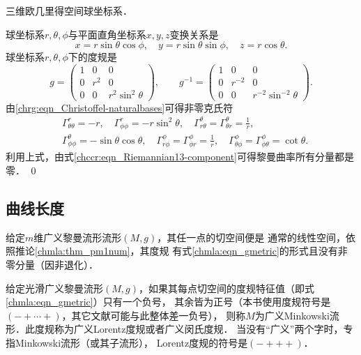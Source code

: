 \begin{example}\label{chrg:exm_S3}
    三维欧几里得空间球坐标系．
\end{example}
球坐标系$r,\theta,\phi$与平面直角坐标系$x,y,z$变换关系是
\begin{equation}\label{chrg:eqn_rtpxyz}
    x  = r\sin\theta \cos\phi ,\quad
    y  = r\sin\theta \sin\phi ,\quad
    z  = r\cos\theta .
\end{equation}
球坐标系$r,\theta,\phi$下的度规是
\begin{equation}\label{chgd:eqn_S3gab}
    g=\begin{pmatrix}  
        1 &0 &0 \\ 0& r^2 & 0 \\ 0& 0 & r^2 \sin^2\theta  
    \end{pmatrix} , \qquad
    g^{-1}=\begin{pmatrix}  
        1 &0&0 \\ 0& r^{-2} & 0 \\ 0& 0 & r^{-2} \sin^{-2}\theta  
    \end{pmatrix} .
\end{equation}
由\eqref{chrg:eqn_Christoffel-naturalbases}可得非零克氏符
\begin{equation}\label{chrg:eqn_S3Gamma}
    \begin{aligned}
        &\Gamma^r_{\theta\theta}=-r,\quad \Gamma^r_{\phi\phi}=-r \sin^2\theta,\quad
        \Gamma^\theta_{r\theta}=\Gamma^\theta_{\theta r}=\frac{1}{r}, \\
        & \Gamma^\theta_{\phi\phi}= - \sin \theta \cos\theta ,\quad
        \Gamma^\phi _{r \phi} = \Gamma^\phi _{\phi r}= \frac{1}{r},\quad
        \Gamma^\phi_{\theta\phi}= \Gamma^\phi_{\phi\theta} = \cot \theta .
    \end{aligned}
\end{equation}
利用上式，由式\eqref{chccr:eqn_Riemannian13-component}可得黎曼曲率所有分量都是零．
\qed


\subsection{曲线长度}\label{chrg:sec_curve-length}

给定$m$维广义黎曼流形流形$(M,g)$，其任一点的切空间便是
通常的线性空间，依照推论\ref{chmla:thm_pm1num}，其度规
有式\eqref{chmla:eqn_gmetric}的形式且没有非零分量（因非退化）．

\begin{definition}\label{chrg:def_Minkowski-space}
    给定光滑广义黎曼流形$(M,g)$，如果其每点切空间的度规特征值（即式\eqref{chmla:eqn_gmetric}）只有一个负号，
    其余皆为正号（本书使用度规符号是$(-+\cdots+)$，其它文献可能与此整体差一负号），
    则称$M$为{\heiti 广义Minkowski流形}．此度规称为{\heiti 广义Lorentz度规}或者广义闵氏度规．
    当没有“广义”两个字时，专指Minkowski流形（或其子流形），
    Lorentz度规的符号是$(-+++)$．
\end{definition}

